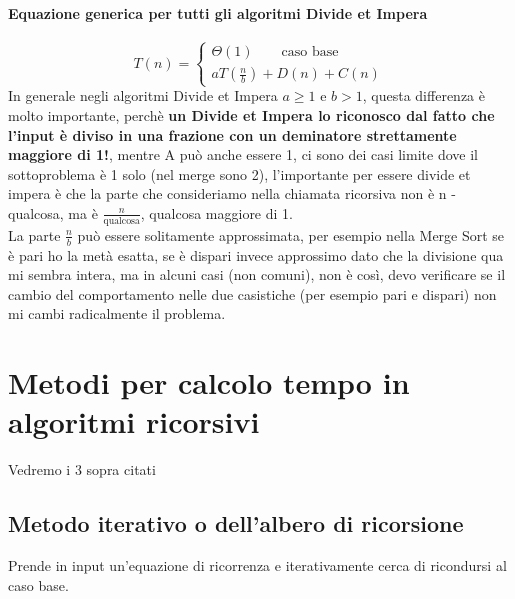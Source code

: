\paragraph*{Equazione generica per tutti gli algoritmi Divide et Impera}
\begin{equation*}
    T(n)=
    \begin{cases}
        \Theta(1) \qquad \text{caso base}\\
        aT(\frac{n}{b}) + D(n)+C(n)
    \end{cases}
\end{equation*}
In generale negli algoritmi Divide et Impera $a \geq 1$ e $b > 1$, questa differenza è molto
importante, perchè \textbf{un Divide et Impera lo riconosco dal fatto che l'input è diviso in una frazione
con un deminatore strettamente maggiore di 1!}, mentre A può anche essere 1, ci sono dei casi limite
dove il sottoproblema è 1 solo (nel merge sono 2), l'importante per essere divide et impera è che la parte
che consideriamo nella chiamata ricorsiva non è n - qualcosa, ma è $\frac{n}{\text{qualcosa}}$, qualcosa
maggiore di 1.\\
La parte $\frac{n}{b}$ può essere solitamente approssimata, per esempio nella Merge Sort se è pari
ho la metà esatta, se è dispari invece approssimo dato che la divisione qua mi sembra intera, ma in alcuni casi (non comuni),
non è così, devo verificare se il cambio del comportamento nelle due casistiche (per esempio pari e dispari) non mi cambi
radicalmente il problema.\\
\section{Metodi per calcolo tempo in algoritmi ricorsivi}
Vedremo i 3 sopra citati
\subsection{Metodo iterativo o dell'albero di ricorsione}
Prende in input un'equazione di ricorrenza e iterativamente cerca di ricondursi al caso base.
